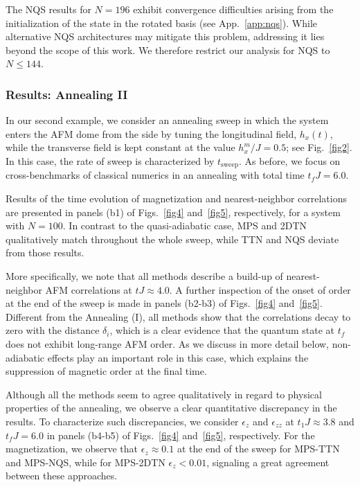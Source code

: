 \documentclass[aps,pra,reprint,amssymb,superscriptaddress]{revtex4-2}
\begin{document}
The NQS results for $N = 196$ exhibit convergence difficulties arising from the initialization of the state in the rotated basis (see App.~\ref{app:nqs}). While alternative NQS architectures may mitigate this problem, addressing it lies beyond the scope of this work. We therefore restrict our analysis for NQS to $N \le 144$.


 
 \subsubsection{Results: Annealing II}

In our second example, we consider an annealing sweep in which the system enters the AFM dome from the side by tuning the longitudinal field, $h_x(t)$, while the transverse field is kept constant at the value $h_x^m/J = 0.5$; see Fig.~\ref{fig2}.
In this case, the rate of sweep is characterized by $t_{\mathrm{sweep}}$. 
As before,  we focus on cross-benchmarks of classical numerics in an annealing with total time $t_f J = 6.0$.

Results of the time evolution of magnetization and nearest-neighbor correlations are presented in  panels (b1) of Figs.~\ref{fig4} and~\ref{fig5}, respectively, for a system with $N = 100$. In contrast to the quasi-adiabatic case,  MPS and 2DTN qualitatively match throughout the whole sweep, while TTN and NQS deviate from those results. 

More specifically, we note that all methods describe a build-up of nearest-neighbor AFM correlations at $tJ \approx 4.0$.
A further inspection of the onset of order at the end of the sweep is made in panels (b2-b3) of Figs.~\ref{fig4} and~\ref{fig5}. Different from the Annealing (I), all methods show that the correlations decay to zero with the distance $\delta_i$, which is a clear evidence that the quantum state at $t_f$ does not exhibit long-range AFM order. As we discuss in more detail below, non-adiabatic effects play an important role in this case, which explains the suppression of magnetic order at the final time.

Although all the methods seem to agree qualitatively in regard to physical properties of the annealing, we observe a clear quantitative discrepancy in the results.
To characterize such discrepancies, we consider  $\epsilon_z$ and  $\epsilon_{zz}$ at $t_1J \approx 3.8$ and $t_fJ = 6.0$ in panels (b4-b5)  of Figs.~\ref{fig4} and~\ref{fig5}, respectively.
For the magnetization, we observe that $\epsilon_z \approx 0.1$ at the end of the sweep for MPS-TTN and MPS-NQS, while for MPS-2DTN  $\epsilon_z < 0.01$, signaling a great agreement between these approaches.
\end{document}
